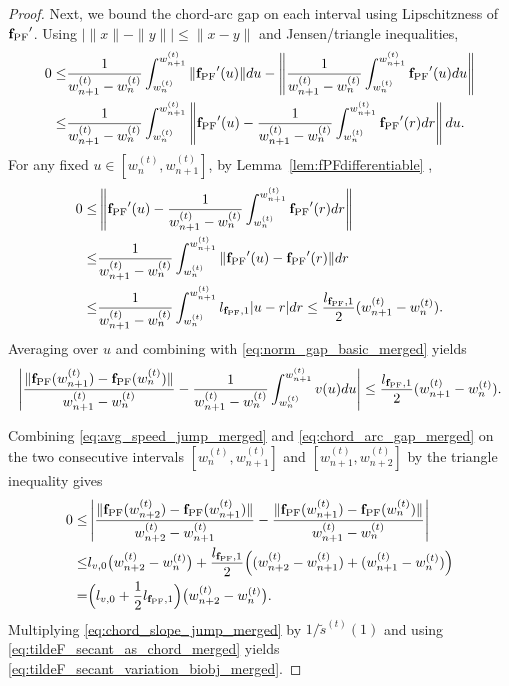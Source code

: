 \documentclass{article}
\newcommand{\fPF}{{\mathbf{f}_{\rm PF}}}
\begin{document}
\begin{proof}
Next, we bound the chord-arc gap on each interval using Lipschitzness of $\fPF'$.
Using $|\|x\|-\|y\||\le \|x-y\|$ and Jensen/triangle inequalities,
\begin{align}
0\le &
\frac{1}{w_{n+1}^{(t)}-w_n^{(t)}}\int_{w_n^{(t)}}^{w_{n+1}^{(t)}}\|\fPF'(u)\| du
-
\left\|
\frac{1}{w_{n+1}^{(t)}-w_n^{(t)}}\int_{w_n^{(t)}}^{w_{n+1}^{(t)}}\fPF'(u) du
\right\|
\nonumber\\
\le &
\frac{1}{w_{n+1}^{(t)}-w_n^{(t)}}\int_{w_n^{(t)}}^{w_{n+1}^{(t)}}
\left\|
\fPF'(u)-\frac{1}{w_{n+1}^{(t)}-w_n^{(t)}}\int_{w_n^{(t)}}^{w_{n+1}^{(t)}}\fPF'(r) dr
\right\|du.
\label{eq:norm_gap_basic_merged}
\end{align}
For any fixed $u\in[w_n^{(t)},w_{n+1}^{(t)}]$, by Lemma~\ref{lem:fPFdifferentiable} ,
\begin{align}
0 \le &\left\|
\fPF'(u)-\frac{1}{w_{n+1}^{(t)}-w_n^{(t)}}\int_{w_n^{(t)}}^{w_{n+1}^{(t)}}\fPF'(r) dr
\right\|
\nonumber\\
\le & 
\frac{1}{w_{n+1}^{(t)}-w_n^{(t)}}\int_{w_n^{(t)}}^{w_{n+1}^{(t)}}
\|\fPF'(u)-\fPF'(r)\| dr
\nonumber\\
\le & 
\frac{1}{w_{n+1}^{(t)}-w_n^{(t)}}\int_{w_n^{(t)}}^{w_{n+1}^{(t)}} l_{\fPF,1}|u-r| dr
\le
\frac{l_{\fPF,1}}{2}(w_{n+1}^{(t)}-w_n^{(t)}).
\label{eq:avg_tangent_dev_merged}
\end{align}
Averaging over $u$ and combining with \eqref{eq:norm_gap_basic_merged} yields
\begin{align}
\left|
\frac{\|\fPF(w_{n+1}^{(t)})-\fPF(w_n^{(t)})\|}{w_{n+1}^{(t)}-w_n^{(t)}}
-
\frac{1}{w_{n+1}^{(t)}-w_n^{(t)}}\int_{w_n^{(t)}}^{w_{n+1}^{(t)}} v(u) du
\right|
\le
\frac{l_{\fPF,1}}{2}(w_{n+1}^{(t)}-w_n^{(t)}).
\label{eq:chord_arc_gap_merged}
\end{align}

Combining \eqref{eq:avg_speed_jump_merged} and \eqref{eq:chord_arc_gap_merged} on the two consecutive intervals
$[w_n^{(t)},w_{n+1}^{(t)}]$ and $[w_{n+1}^{(t)},w_{n+2}^{(t)}]$ by the triangle inequality gives
\begin{align}
0 \le &\left| \frac{\|\fPF(w_{n+2}^{(t)})-\fPF(w_{n+1}^{(t)})\|}{w_{n+2}^{(t)}-w_{n+1}^{(t)}} - \frac{\|\fPF(w_{n+1}^{(t)})-\fPF(w_n^{(t)})\|}{w_{n+1}^{(t)}-w_n^{(t)}} \right| \nonumber\\
\le & 
l_{v,0}\bigl(w_{n+2}^{(t)}-w_n^{(t)}\bigr)
+\frac{l_{\fPF,1}}{2}
\Bigl((w_{n+2}^{(t)}-w_{n+1}^{(t)})+(w_{n+1}^{(t)}-w_n^{(t)})\Bigr)
\nonumber\\
= & 
\Bigl(l_{v,0}+\frac12 l_{\fPF,1}\Bigr)
\bigl(w_{n+2}^{(t)}-w_n^{(t)}\bigr).
\label{eq:chord_slope_jump_merged}
\end{align}
Multiplying \eqref{eq:chord_slope_jump_merged} by $1/\tilde s^{(t)}(1)$ and using \eqref{eq:tildeF_secant_as_chord_merged}
yields \eqref{eq:tildeF_secant_variation_biobj_merged}.
\end{proof}
\end{document}
